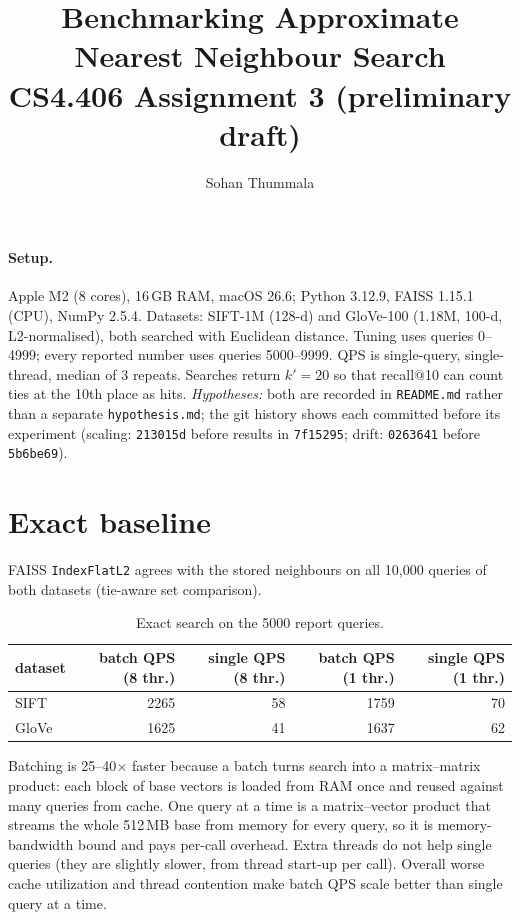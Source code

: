 \documentclass[10pt,a4paper]{article}
\title{Benchmarking Approximate Nearest Neighbour Search\\\large CS4.406 Assignment 3 (preliminary draft)}
\author{Sohan Thummala}
\date{}
\begin{document}
\maketitle
\vspace{-2em}

\paragraph{Setup.}
Apple M2 (8 cores), 16\,GB RAM, macOS 26.6; Python 3.12.9, FAISS 1.15.1 (CPU), NumPy 2.5.4.
Datasets: SIFT-1M (128-d) and GloVe-100 (1.18M, 100-d, L2-normalised), both searched with
Euclidean distance. Tuning uses queries 0--4999; every reported number uses queries 5000--9999.
QPS is single-query, single-thread, median of 3 repeats. Searches return $k'=20$ so that
recall@10 can count ties at the 10th place as hits. \emph{Hypotheses:} both are recorded in
\texttt{README.md} rather than a separate \texttt{hypothesis.md}; the git history shows each
committed before its experiment (scaling: \texttt{213015d} before results in \texttt{7f15295};
drift: \texttt{0263641} before \texttt{5b6be69}).

\section{Exact baseline}
FAISS \texttt{IndexFlatL2} agrees with the stored neighbours on all 10{,}000 queries of both
datasets (tie-aware set comparison).

\begin{table}[h]\centering\small
\begin{tabular}{lrrrr}
\toprule
dataset & batch QPS (8 thr.) & single QPS (8 thr.) & batch QPS (1 thr.) & single QPS (1 thr.) \\
\midrule
SIFT  & 2265 & 58 & 1759 & 70 \\
GloVe & 1625 & 41 & 1637 & 62 \\
\bottomrule
\end{tabular}
\caption{Exact search on the 5000 report queries.}
\end{table}

Batching is 25--40$\times$ faster because a batch turns search into a matrix--matrix product: each block of base vectors is loaded from RAM once and reused against many queries from cache. One query at a time is a matrix--vector product that streams the whole 512\,MB base from memory for every query, so it is memory-bandwidth bound and pays per-call overhead.
Extra threads do not help single queries (they are slightly slower, from thread start-up per call). Overall worse cache utilization and thread contention make batch QPS scale better than single query at a time.
\end{document}
